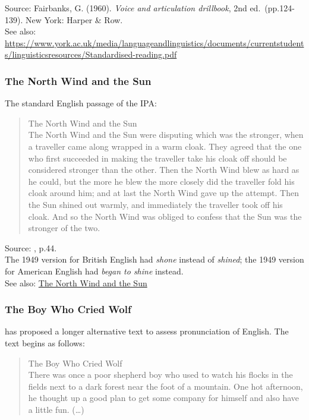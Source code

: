\documentclass[
]{book}
\begin{document}
Source: Fairbanks, G. (1960). \emph{Voice and articulation drillbook}, 2nd ed.~(pp.124-139). New York: Harper \& Row.\\
See also: \url{https://www.york.ac.uk/media/languageandlinguistics/documents/currentstudents/linguisticsresources/Standardised-reading.pdf}

\subsubsection{The North Wind and the Sun}\label{the-north-wind-and-the-sun}

The standard English passage of the IPA:

\begin{quote}
The North Wind and the Sun\\
The North Wind and the Sun were disputing which was the stronger, when a traveller came along wrapped in a
warm cloak. They agreed that the one who first succeeded in making the traveller take his cloak off should be considered stronger than the other. Then the North Wind blew as hard as he could, but the more he blew the more closely did the traveller fold his cloak around him; and at last the North Wind gave up the attempt. Then the Sun shined out warmly, and immediately the traveller took off his cloak. And so the North Wind was obliged to confess that the Sun was the stronger of the two.
\end{quote}

Source: \citet{HandbookIPA_1999}, p.44.\\
The 1949 version for British English had \emph{shone} instead of \emph{shined}; the 1949 version for American English had \emph{began to shine} instead.\\
See also: \href{https://en.wikipedia.org/wiki/The_North_Wind_and_the_Sun}{The North Wind and the Sun}

\subsubsection{The Boy Who Cried Wolf}\label{the-boy-who-cried-wolf}

\citet{Deterding_2006} has proposed a longer alternative text to assess pronunciation of English. The text begins as follows:

\begin{quote}
The Boy Who Cried Wolf\\
There was once a poor shepherd boy who used to watch his flocks in the fields next to a dark forest near the foot of a mountain. One hot afternoon, he thought up a good plan to get some company for himself and also have a little fun. (\ldots)
\end{quote}
\end{document}
